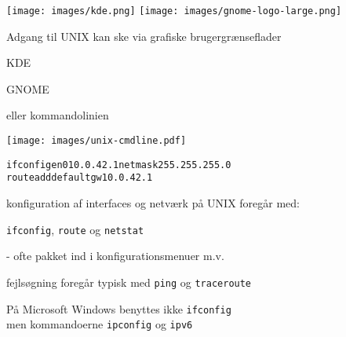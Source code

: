 
\begin{center}
\texttt{[image: images/kde.png]}
\texttt{[image: images/gnome-logo-large.png]}
\end{center}

\begin{list1}
\item Adgang til UNIX kan ske via grafiske brugergrænseflader
  \begin{list2}
  \item KDE 
  \item GNOME 
  \end{list2}
\item eller kommandolinien
\end{list1}
\centerline{\texttt{[image: images/unix-cmdline.pdf]}}


















\begin{alltt}
ifconfig en0 10.0.42.1 netmask 255.255.255.0
route add default gw 10.0.42.1 
\end{alltt}

\begin{list1}
\item konfiguration af interfaces og netværk på UNIX foregår med:
\item \verb+ifconfig+, \verb+route+ og \verb+netstat+  
\item - ofte pakket ind i konfigurationsmenuer m.v.
\item fejlsøgning foregår typisk med \verb+ping+ og \verb+traceroute+
\item På Microsoft Windows benyttes ikke \verb+ifconfig+\\
men kommandoerne \verb+ipconfig+ og \verb+ipv6+
\end{list1}


